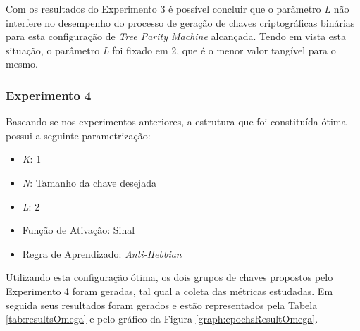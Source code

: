 \documentclass[12pt]{article}
\begin{document}
                
                
                Com os resultados do Experimento 3 é possível concluir que o parâmetro \textit{L} não interfere no desempenho do processo de geração de chaves criptográficas binárias para esta configuração de \textit{Tree Parity Machine} alcançada. Tendo em vista esta situação, o parâmetro \textit{L} foi fixado em 2, que é o menor valor tangível para o mesmo.
            
            \subsubsection{Experimento 4}
            \label{subsubsec:experimentoOmega}
            
                Baseando-se nos experimentos anteriores, a estrutura que foi constituída ótima possui a seguinte parametrização:
                
                \begin{itemize}
                    \item \textit{K}: 1
                    \item \textit{N}: Tamanho da chave desejada
                    \item \textit{L}: 2
                    \item Função de Ativação: Sinal
                    \item Regra de Aprendizado: \textit{Anti-Hebbian}
                \end{itemize}
                
                
                Utilizando esta configuração ótima, os dois grupos de chaves propostos pelo Experimento 4 foram geradas, tal qual a coleta das métricas estudadas. Em seguida seus resultados foram gerados e estão representados pela Tabela \ref{tab:resultsOmega} e pelo gráfico da Figura \ref{graph:epochsResultOmega}.
                
                
                
\end{document}
